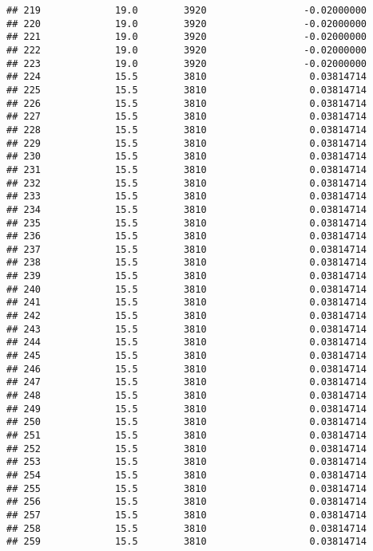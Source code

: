 \documentclass[]{article}
\begin{document}
\begin{verbatim}
## 219             19.0        3920                 -0.02000000
## 220             19.0        3920                 -0.02000000
## 221             19.0        3920                 -0.02000000
## 222             19.0        3920                 -0.02000000
## 223             19.0        3920                 -0.02000000
## 224             15.5        3810                  0.03814714
## 225             15.5        3810                  0.03814714
## 226             15.5        3810                  0.03814714
## 227             15.5        3810                  0.03814714
## 228             15.5        3810                  0.03814714
## 229             15.5        3810                  0.03814714
## 230             15.5        3810                  0.03814714
## 231             15.5        3810                  0.03814714
## 232             15.5        3810                  0.03814714
## 233             15.5        3810                  0.03814714
## 234             15.5        3810                  0.03814714
## 235             15.5        3810                  0.03814714
## 236             15.5        3810                  0.03814714
## 237             15.5        3810                  0.03814714
## 238             15.5        3810                  0.03814714
## 239             15.5        3810                  0.03814714
## 240             15.5        3810                  0.03814714
## 241             15.5        3810                  0.03814714
## 242             15.5        3810                  0.03814714
## 243             15.5        3810                  0.03814714
## 244             15.5        3810                  0.03814714
## 245             15.5        3810                  0.03814714
## 246             15.5        3810                  0.03814714
## 247             15.5        3810                  0.03814714
## 248             15.5        3810                  0.03814714
## 249             15.5        3810                  0.03814714
## 250             15.5        3810                  0.03814714
## 251             15.5        3810                  0.03814714
## 252             15.5        3810                  0.03814714
## 253             15.5        3810                  0.03814714
## 254             15.5        3810                  0.03814714
## 255             15.5        3810                  0.03814714
## 256             15.5        3810                  0.03814714
## 257             15.5        3810                  0.03814714
## 258             15.5        3810                  0.03814714
## 259             15.5        3810                  0.03814714

\end{verbatim}
\end{document}
